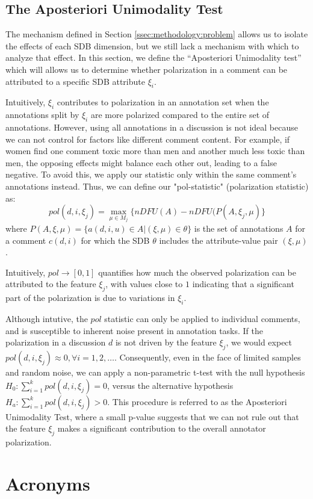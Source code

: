 \documentclass{article}
\begin{document}
\subsection{The Aposteriori Unimodality Test}
\label{ssec:methodology:aposteriori}

The mechanism defined in Section \ref{ssec:methodology:problem} allows us to isolate the effects of each \ac{SDB} dimension, but we still lack a mechanism with which to analyze that effect. In this section, we define the ``Aposteriori Unimodality test'' which will allows us to determine whether polarization in a comment can be attributed to a specific \ac{SDB} attribute $\xi_i$.

Intuitively, $\xi_i$ contributes to polarization in an annotation set when the annotations split by  $\xi_i$ are more polarized compared to the entire set of annotations. However, using all annotations in a discussion is not ideal because we can not control for factors like different comment content. For example, if women find one comment toxic more than men and another much less toxic than men, the opposing effects might balance each other out, leading to a false negative. To avoid this, we apply our statistic only within the same comment’s annotations instead. Thus, we can define our "pol-statistic" (polarization statistic) as:
\begin{equation}
	pol(d, i, \xi_j) = \max_{\mu \in M_j}\{nDFU(A) - nDFU(P(A, \xi_j, \mu)\}
\end{equation}
\noindent where $P(A,\xi, \mu) = \{a(d, i, u) \in A | (\xi, \mu) \in \theta\}$ is the set of annotations $A$ for a comment $c(d, i)$ for which the \ac{SDB} $\theta$ includes the attribute-value pair $(\xi, \mu)$. 

Intuitively, $pol \rightarrow [0,1]$ quantifies how much the observed polarization can be attributed to the feature $\xi_j$, with values close to $1$ indicating that a significant part of the polarization is due to variations in $\xi_i$. 

Although intutive, the $pol$ statistic can only be applied to individual comments, and is susceptible to inherent noise present in annotation tasks. If the polarization in a discussion $d$ is not driven by the feature $\xi_j$, we would expect $pol(d, i, \xi_j) \approx 0, \forall i=1, 2, \ldots$. Consequently, even in the face of limited samples and random noise, we can apply a non-parametric t-test with the null hypothesis $H_0: \sum_{i=1}^k pol(d, i, \xi_j) = 0$, versus the alternative hypothesis $H_a: \sum_{i=1}^k pol(d, i, \xi_j) > 0$. This procedure is referred to as the Aposteriori Unimodality Test, where a small p-value suggests that we can not rule out that the feature $\xi_j$ makes a significant contribution to the overall annotator polarization.


\section{Acronyms}

\begin{acronym}[WWW]
\end{acronym}
\end{document}
